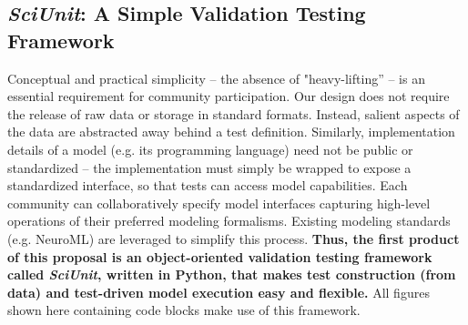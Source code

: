 \documentclass[11pt,letterpaper]{article}
\begin{document}
\subsection{\textit{SciUnit}: A Simple Validation Testing Framework}
Conceptual and practical simplicity -- the absence of "heavy-lifting'' -- is an essential requirement for community participation. Our design does not require the release of raw data or storage in standard formats. Instead, salient aspects of the data are abstracted away behind a test definition. Similarly, implementation details of a model (e.g. its programming language) need not be public or standardized -- the implementation must simply be wrapped to expose a standardized interface, so that tests can access model capabilities. Each community can collaboratively specify model interfaces capturing high-level operations of their preferred modeling formalisms. Existing modeling standards (e.g. NeuroML\cite{neuroml_url,gleeson_neuroml:_2010}) are leveraged to simplify this process. \textbf{Thus, the first product of this proposal is an object-oriented validation testing framework called \textit{SciUnit}, written in Python, that makes test construction (from data) and test-driven model execution easy and flexible.} All figures shown here containing code blocks make use of this framework.  
\end{document}
